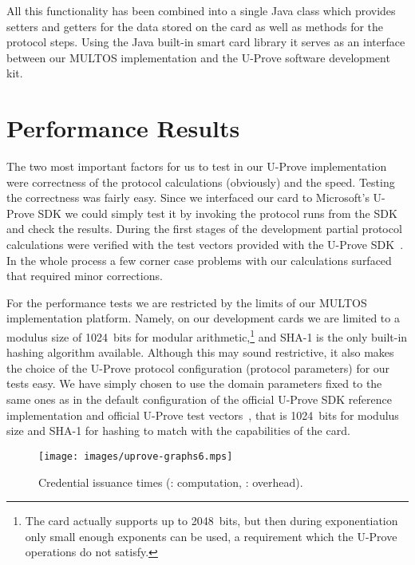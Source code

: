 All this functionality has been combined into a single Java class which provides
setters and getters for the data stored on the card as well as methods for the
protocol steps. Using the Java built-in smart card library it serves as an
interface between our MULTOS implementation and the U-Prove software development
kit.

\section{Performance Results}

The two most important factors for us to test in our U-Prove implementation were
correctness of the protocol calculations (obviously) and the speed. Testing the
correctness was fairly easy. Since we interfaced our card to Microsoft's U-Prove
SDK we could simply test it by invoking the protocol runs from the SDK and check
the results. During the first stages of the development partial protocol
calculations were verified with the test vectors provided with the U-Prove
SDK~\cite{U-Prove_Vectors2011}. In the whole process a few corner case problems
with our calculations surfaced that required minor corrections.

For the performance tests we are restricted by the limits of our MULTOS
implementation platform. Namely, on our development cards we are limited to a
modulus size of 1024~bits for modular arithmetic,\footnote{The card actually
supports up to 2048~bits, but then during exponentiation only small enough
exponents can be used, a requirement which the U-Prove operations do not
satisfy.} and SHA-1 is the only built-in hashing algorithm available. Although
this may sound restrictive, it also makes the choice of the U-Prove protocol
configuration (protocol parameters) for our tests easy. We have simply chosen to
use the domain parameters fixed to the same ones as in the default configuration
of the official U-Prove SDK reference implementation and official U-Prove test
vectors~\cite{U-Prove_Vectors2011}, that is 1024~bits for modulus size and SHA-1
for hashing to match with the capabilities of the card.

\begin{figure}
  \centering
  \texttt{[image: images/uprove-graphs6.mps]}
  \caption[Credential issuance times.]{
    Credential issuance times
    (: computation,
      : overhead).}
  \label{fig:issue}
\end{figure}

